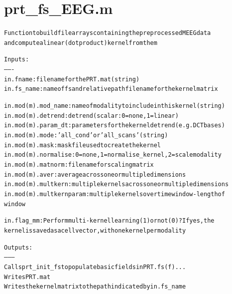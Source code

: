 \section{prt\_fs\_EEG.m}
\begin{alltt}

 Function to build file arrays containing the preprocessed MEEG data
 and compute a linear (dot product) kernel from them
 
 Inputs:
 -------
 in.fname:      filename for the PRT.mat (string)
 in.fs\_name:    name of fs and relative path filename for the kernel matrix
 
 in.mod(m).mod\_name:  name of modality to include in this kernel (string)
 in.mod(m).detrend:   detrend (scalar: 0 = none, 1 = linear)
 in.mod(m).param\_dt:  parameters for the kernel detrend (e.g. DCT bases)
 in.mod(m).mode:      'all\_cond' or 'all\_scans' (string)
 in.mod(m).mask:      mask file used to create the kernel
 in.mod(m).normalise: 0 = none, 1 = normalise\_kernel, 2 = scale modality
 in.mod(m).matnorm:   filename for scaling matrix
 in.mod(m).aver:       average across one or multiple dimensions
 in.mod(m).multkern:   multiple kernels across one or multiple dimensions
 in.mod(m).multkernparam:   multiple kernels over time window - length of
                            window

 
 in.flag\_mm:   Perform multi-kernel learning (1) or not (0)? If yes, the
 kernel is saved as a cell vector, with one kernel per modality
 
 Outputs:
 --------
 Calls prt\_init\_fs to populate basic fields in PRT.fs(f)...
 Writes PRT.mat
 Writes the kernel matrix to the path indicated by in.fs\_name
\end{alltt}


